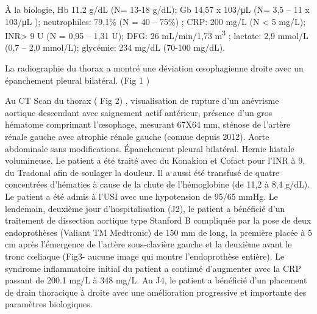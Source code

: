 \documentclass[./tfe]{subfiles}
\begin{document}
À la biologie, Hb 11.2 g/dL (N= 13-18 g/dL); Gb 14,57 x 103/\si{\micro\liter} (N= 3,5 – 11 x 103/\si{\micro\liter} ); neutrophiles: 79,1\% (N = 40 – 75\%) ; CRP: 200 mg/L (N < 5 mg/L); INR> 9 U (N = 0,95 – 1,31 U); DFG: 26 mL/min/1,73 \si{\cubic\meter} ; lactate: 2,9 mmol/L (0,7 – 2,0 mmol/L); glycémie: 234 mg/dL (70-100 mg/dL).

La radiographie du thorax a montré une déviation œsophagienne droite avec un épanchement pleural bilatéral. (Fig 1 )

Au CT Scan du thorax ( Fig 2) , visualisation de rupture d'un anévrisme aortique descendant avec saignement actif antérieur, présence d'un gros hématome comprimant l'œsophage, mesurant 67X64 mm, sténose de l'artère rénale gauche avec atrophie rénale gauche (connue depuis 2012). Aorte abdominale sans modifications. Épanchement pleural bilatéral. Hernie hiatale volumineuse. Le patient a été traité avec du Konakion et Cofact pour l’INR à 9, du Tradonal afin de soulager la douleur. Il a aussi été transfusé de quatre concentrées d’hématies à cause de la chute de l’hémoglobine (de 11,2 à 8,4 g/dL). Le patient a été admis à l'USI avec une hypotension de 95/65 mmHg. Le lendemain, deuxième jour d'hospitalisation (J2), le patient a bénéficié d'un traitement de dissection aortique type Stanford B compliquée par la pose de deux endoprothèses (Valiant TM Medtronic) de 150 mm de long, la première placée à 5 cm après l'émergence de l'artère sous-clavière gauche et la deuxième avant le tronc cœliaque (Fig3- aucune image qui montre l’endoprothèse entière). Le syndrome inflammatoire initial du patient a continué d’augmenter avec la CRP passant de 200.1 mg/L à 348 mg/L. Au J4, le patient a bénéficié d’un placement de drain thoracique à droite avec une amélioration progressive et importante des paramètres biologiques.
\end{document}
